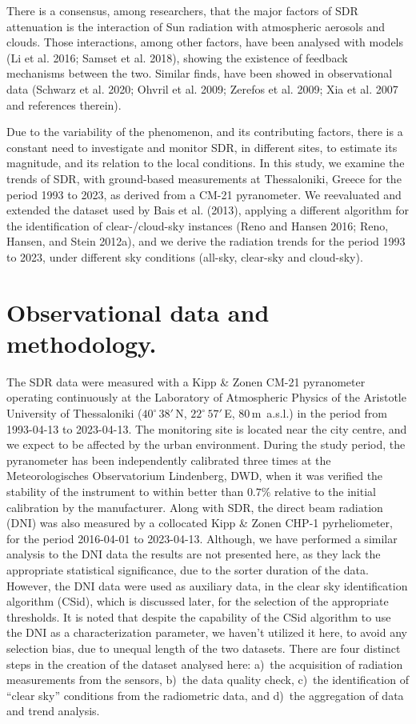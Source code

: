 \documentclass[
  preprint, 3p, authoryear]{article}
\begin{document}
There is a consensus, among researchers, that the major factors of SDR attenuation is the interaction of Sun radiation with atmospheric aerosols and clouds.
Those interactions, among other factors, have been analysed with models (Li et al. 2016; Samset et al. 2018), showing the existence of feedback mechanisms between the two.
Similar finds, have been showed in observational data (Schwarz et al. 2020; Ohvril et al. 2009; Zerefos et al. 2009; Xia et al. 2007 and references therein).

Due to the variability of the phenomenon, and its contributing factors, there is a constant need to investigate and monitor SDR, in different sites, to estimate its magnitude, and its relation to the local conditions.
In this study, we examine the trends of SDR, with ground-based measurements at Thessaloniki, Greece for the period 1993 to 2023, as derived from a CM-21 pyranometer.
We reevaluated and extended the dataset used by Bais et al. (2013), applying a different algorithm for the identification of clear-/cloud-sky instances (Reno and Hansen 2016; Reno, Hansen, and Stein 2012a), and we derive the radiation trends for the period 1993 to 2023, under different sky conditions (all-sky, clear-sky and cloud-sky).

\hypertarget{observational-data-and-methodology.}{%
\section{Observational data and methodology.}\label{observational-data-and-methodology.}}

The SDR data were measured with a Kipp \& Zonen CM-21 pyranometer operating continuously at the Laboratory of Atmospheric Physics of the Aristotle University of Thessaloniki
(\(40^\circ\,38'\,\)N, \(22^\circ\,57'\,\)E, \(80\,\)m~a.s.l.)
in the period from
1993-04-13
to
2023-04-13.
The monitoring site is located near the city centre, and we expect to be affected by the urban environment.
During the study period, the pyranometer has been independently calibrated three times at the Meteorologisches Observatorium Lindenberg, DWD, when it was verified the stability of the instrument to within better than \(0.7\%\) relative to the initial calibration by the manufacturer.
Along with SDR, the direct beam radiation (DNI) was also measured by a collocated Kipp \& Zonen CHP-1 pyrheliometer, for the period
2016-04-01
to
2023-04-13.
Although, we have performed a similar analysis to the DNI data the results are not presented here, as they lack the appropriate statistical significance, due to the sorter duration of the data.
However, the DNI data were used as auxiliary data, in the clear sky identification algorithm (CSid), which is discussed later, for the selection of the appropriate thresholds.
It is noted that despite the capability of the CSid algorithm to use the DNI as a characterization parameter, we haven't utilized it here, to avoid any selection bias, due to unequal length of the two datasets.
There are four distinct steps in the creation of the dataset analysed here:
a)~the acquisition of radiation measurements from the sensors,
b)~the data quality check,
c)~the identification of ``clear sky'' conditions from the radiometric data, and
d)~the aggregation of data and trend analysis.
\end{document}
